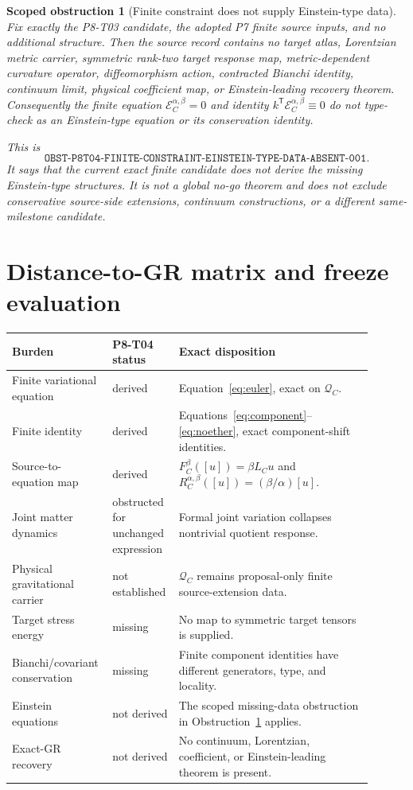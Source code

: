 \documentclass[11pt]{article}
\newtheorem{obstruction}{Scoped obstruction}
\newcommand{\Qspace}{\mathcal Q_C}
\newcommand{\Eop}{\mathcal E_C^{\alpha,\beta}}
\begin{document}
\begin{obstruction}[Finite constraint does not supply Einstein-type data]
\label{obs:einstein}
Fix exactly the P8-T03 candidate, the adopted P7 finite source inputs, and no
additional structure.  Then the source record contains no target atlas,
Lorentzian metric carrier, symmetric rank-two target response map,
metric-dependent curvature operator, diffeomorphism action, contracted
Bianchi identity, continuum limit, physical coefficient map, or
Einstein-leading recovery theorem.  Consequently the finite equation
\(\Eop=0\) and identity \(k^{\mathsf T}\Eop\equiv0\) do not type-check as an
Einstein-type equation or its conservation identity.

This is
\[
\texttt{OBST-P8T04-FINITE-CONSTRAINT-EINSTEIN-TYPE-DATA-ABSENT-001}.
\]
It says that the current exact finite candidate does not derive the missing
Einstein-type structures.  It is not a global no-go theorem and does not
exclude conservative source-side extensions, continuum constructions, or a
different same-milestone candidate.
\end{obstruction}

\section{Distance-to-GR matrix and freeze evaluation}

\begin{longtable}{p{0.22\linewidth}p{0.16\linewidth}p{0.52\linewidth}}
\toprule
Burden & P8-T04 status & Exact disposition\\
\midrule
Finite variational equation &
derived &
Equation~\eqref{eq:euler}, exact on \(\Qspace\).\\
Finite identity &
derived &
Equations~\eqref{eq:component}--\eqref{eq:noether}, exact component-shift
identities.\\
Source-to-equation map &
derived &
\(F_C^\beta([u])=\beta L_Cu\) and
\(R_C^{\alpha,\beta}([u])=(\beta/\alpha)[u]\).\\
Joint matter dynamics &
obstructed for unchanged expression &
Formal joint variation collapses nontrivial quotient response.\\
Physical gravitational carrier &
not established &
\(\Qspace\) remains proposal-only finite source-extension data.\\
Target stress energy &
missing &
No map to symmetric target tensors is supplied.\\
Bianchi/covariant conservation &
missing &
Finite component identities have different generators, type, and locality.\\
Einstein equations &
not derived &
The scoped missing-data obstruction in Obstruction~\ref{obs:einstein}
applies.\\
Exact-GR recovery &
not derived &
No continuum, Lorentzian, coefficient, or Einstein-leading theorem is
present.\\
\bottomrule
\end{longtable}
\end{document}
